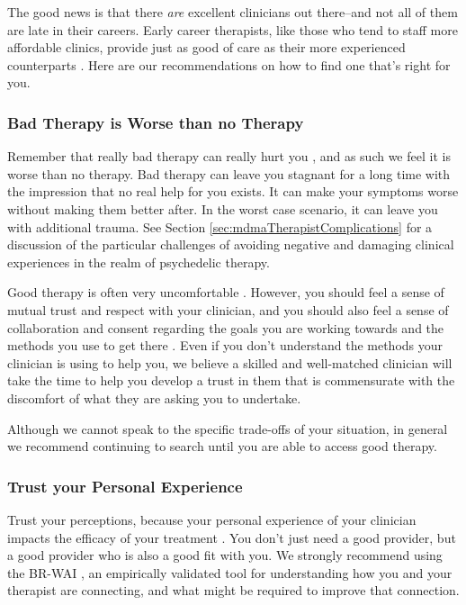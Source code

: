 \documentclass[12pt,letterpaper]{book}
\begin{document}
The good news is that there \textit{are} excellent clinicians out there–and not all of them are late  in their careers. Early career therapists, like those who tend to staff more affordable clinics, provide just as good of care as their more experienced counterparts \cite{goldberg2016psychotherapists}. Here are our recommendations on how to find one that's right for you.

\subsubsection*{Bad Therapy is Worse than no Therapy}
Remember that really bad therapy can really hurt you \cite{hook2018boundary}, and as such we feel it is worse than no therapy. Bad therapy can leave you stagnant for a long time with the impression that no real help for you exists. It can make your symptoms worse without making them better after. In the worst case scenario, it can leave you with additional trauma. See Section \ref{sec:mdmaTherapistComplications} for a discussion of the particular challenges of avoiding negative and damaging clinical experiences in the realm of psychedelic therapy.

Good therapy is often very uncomfortable \cite{eckerUnlocking}. However, you should feel a sense of mutual trust and respect with your clinician, and you should also feel a sense of collaboration and consent regarding the goals you are working towards and the methods you use to get there \cite{BRWAIdownload}. Even if you don't understand the methods your clinician is using to help you, we believe a skilled and well-matched clinician will take the time to help you develop a trust in them that is commensurate with the discomfort of what they are asking you to undertake.

Although we cannot speak to the specific trade-offs of your situation, in general we recommend continuing to search until you are able to access good therapy.

\subsubsection*{Trust your Personal Experience}
Trust your perceptions, because your personal experience of your clinician impacts the efficacy of your treatment \cite{horvath2011alliance}. You don't just need a good provider, but a good provider who is also a good fit with you. We strongly recommend using the BR-WAI \cite{BRWAIdownload}, an empirically validated tool for understanding how you and your therapist are connecting, and what might be required to improve that connection.
\end{document}
